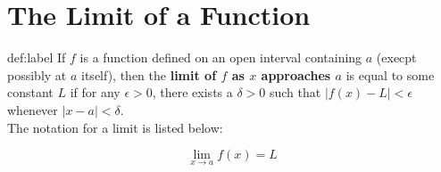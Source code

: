 \documentclass{package/notes}
\begin{document}
\section{The Limit of a Function}


\begin{definition}{def:label}
	If $f$ is a function defined on an open interval containing $a$ (execpt possibly at $a$ itself), then the \textbf{limit of $f$ as $x$ approaches $a$} is equal to some constant $L$ if for any $\epsilon > 0$, there exists a $\delta > 0$ such that $|f(x) - L| < \epsilon$ whenever $|x-a| < \delta$.\\
	
	The notation for a limit is listed below:

	$$\lim_{x \to a} f(x) = L$$
\end{definition}\newpage
\end{document}
